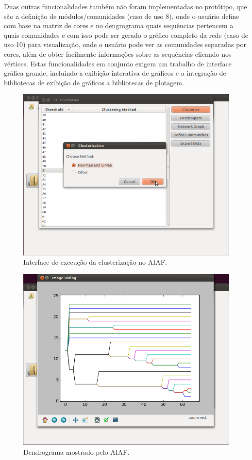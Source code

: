 Duas outras funcionalidades também não foram implementadas no protótipo, que são a definição de módulos/comunidades (caso de uso 8), onde o usuário define
com base na matriz de cores e no dengrograma quais sequências pertencem a quais comunidades e com isso pode ser gerado o gréfico completo da rede (caso de
uso 10) para visualização, onde o usuário pode ver as comunidades separadas por cores, além de obter facilmente informações sobre as sequências clicando nos
vértices. Estas funcionalidades em conjunto
exigem um trabalho de interface gráfica grande, incluindo a exibição interativa de gráficos e a integração de bibliotecas de exibição de
gráficos a bibliotecas de plotagem.

\begin{figure}
\centering
\includegraphics[scale=0.38]{clustering-gui}
\caption{Interface de execução da clusterização no AIAF.}
\label{fig:clustering-gui}
\end{figure}

\begin{figure}
\centering
\includegraphics[scale=0.38]{navi-dendrogram}
\caption{Dendrograma mostrado pelo AIAF.}
\label{fig:navi-dendrogram}
\end{figure}

